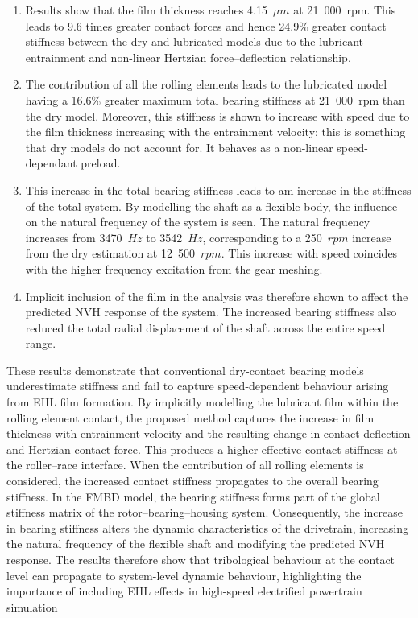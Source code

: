 \begin{enumerate} 
	\item Results show that the film thickness reaches 4.15~${\mu m}$ at 21~000~$\mathrm{rpm}$. This leads to 9.6 times greater contact forces and hence 24.9\% greater contact stiffness between the dry and lubricated models due to the lubricant entrainment and non-linear Hertzian force–deflection relationship.
	\item The contribution of all the rolling elements leads to the lubricated model having a 16.6\% greater maximum total bearing stiffness at 21~000~$\mathrm{rpm}$ than the dry model. Moreover, this stiffness is shown to increase with speed due to the film thickness increasing with the entrainment velocity; this is something that dry models do not account for. It behaves as a non-linear speed-dependant preload.
	\item This increase in the total bearing stiffness leads to am increase in the stiffness of the total system. By modelling the shaft as a flexible body, the influence on the natural frequency of the system is seen. The natural frequency increases from 3470~$Hz$ to 3542~$Hz$, corresponding to a 250~$rpm$ increase from the dry estimation at 12~500~$rpm$. This increase with speed coincides with the higher frequency excitation from the gear meshing.
	\item Implicit inclusion of the film in the analysis was therefore shown to affect the predicted NVH response of the system. The increased bearing stiffness also reduced the total radial displacement of the shaft across the entire speed range.
\end{enumerate}

These results demonstrate that conventional dry-contact bearing models underestimate stiffness and fail to capture speed-dependent behaviour arising from EHL film formation. By implicitly modelling the lubricant film within the rolling element contact, the proposed method captures the increase in film thickness with entrainment velocity and the resulting change in contact deflection and Hertzian contact force. This produces a higher effective contact stiffness at the roller–race interface. When the contribution of all rolling elements is considered, the increased contact stiffness propagates to the overall bearing stiffness. In the FMBD model, the bearing stiffness forms part of the global stiffness matrix of the rotor–bearing–housing system. Consequently, the increase in bearing stiffness alters the dynamic characteristics of the drivetrain, increasing the natural frequency of the flexible shaft and modifying the predicted NVH response. The results therefore show that tribological behaviour at the contact level can propagate to system-level dynamic behaviour, highlighting the importance of including EHL effects in high-speed electrified powertrain simulation

